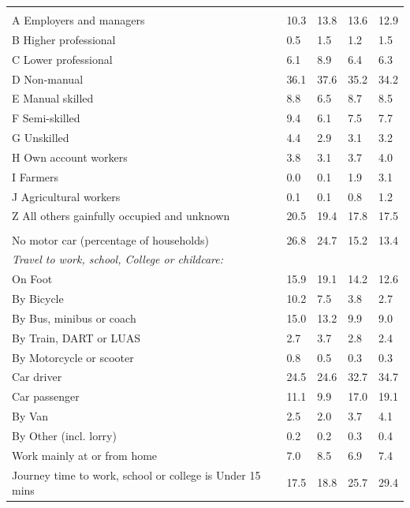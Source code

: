 \documentclass{article}
\begin{document}
\begin{table}[h]
\begin{tabular}{KTTTT}
\hline
    \\ 
    \hline
A Employers and managers & 10.3& 13.8& 13.6& 12.9\\
B Higher professional & 0.5& 1.5& 1.2& 1.5\\
C Lower professional & 6.1& 8.9& 6.4& 6.3\\
D Non-manual & 36.1& 37.6& 35.2& 34.2\\
E Manual skilled & 8.8& 6.5& 8.7& 8.5\\
F Semi-skilled & 9.4& 6.1& 7.5& 7.7\\
G Unskilled & 4.4& 2.9& 3.1& 3.2\\
H Own account workers & 3.8& 3.1& 3.7& 4.0\\
I Farmers & 0.0& 0.1& 1.9& 3.1\\
J Agricultural workers & 0.1& 0.1& 0.8& 1.2\\
Z All others gainfully occupied and unknown & 20.5& 19.4& 17.8& 17.5\\
\hline
{}\hline
    \\ 
    \hline
No motor car (percentage of households) & 26.8& 24.7& 15.2& 
13.4\\
    \hline 
\emph{Travel to work, school, College or childcare:} & & & \\
\quad On Foot & 15.9& 19.1& 14.2& 12.6\\ 
\quad By Bicycle & 10.2&  7.5&  3.8&  2.7\\ 
\quad By Bus, minibus or coach & 15.0& 13.2&  9.9&  9.0\\
\quad By Train, DART or LUAS & 2.7& 3.7& 2.8& 2.4\\
\quad By Motorcycle or scooter & 0.8& 0.5& 0.3& 0.3\\
\quad Car driver & 24.5 & 24.6& 32.7& 34.7\\
\quad Car passenger & 11.1&  9.9& 17.0& 19.1\\
\quad By Van & 2.5& 2.0& 3.7& 4.1\\
\quad By Other (incl. lorry) & 0.2& 0.2& 0.3& 0.4\\
    \hline
Work mainly at or from home & 7.0& 8.5& 6.9& 7.4\\
Journey time to work, school or college is Under 15 mins & 17.5& 18.8& 25.7& 29.4\\

\end{tabular}
\end{table}
\end{document}
